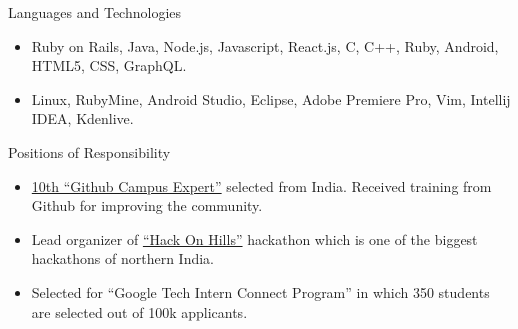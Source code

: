 \documentclass[]{mcdowellcv}
\begin{document}
	\begin{cvsection}{Languages and Technologies}
		\begin{cvsubsection}{}{}{}	
			\begin{itemize}
				\item Ruby on Rails, Java, Node.js, Javascript, React.js, C, C++, Ruby, Android, HTML5, CSS, GraphQL.
				\item Linux, RubyMine, Android Studio, Eclipse, Adobe Premiere Pro, Vim, Intellij IDEA, Kdenlive.
			\end{itemize}
		\end{cvsubsection}
	\end{cvsection}
	
	\begin{cvsection}{Positions of Responsibility}
		\begin{cvsubsection}{}{}{}	
			\begin{itemize}
				\item {\href {https://githubcampus.expert/sukhbir-singh/}{10th ``Github Campus Expert''}} selected from India. Received training from Github for improving the community.
				\item Lead organizer of {\href {http://hackonhills.com/}{``Hack On Hills''}} hackathon which is one of the biggest hackathons of northern India.
				\item Selected for ``Google Tech Intern Connect Program'' in which 350 students are selected out of 100k applicants.
			\end{itemize}
		\end{cvsubsection}
	\end{cvsection}
	
\end{document}
